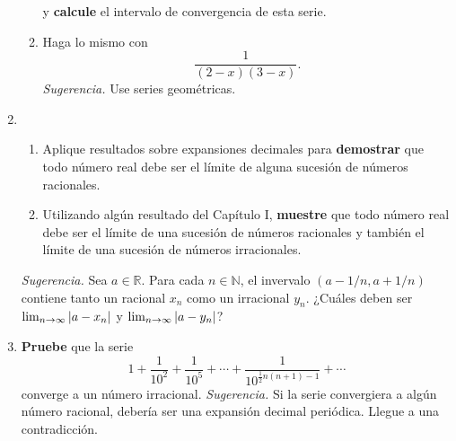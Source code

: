 \documentclass[12pt]{article}
\begin{document}
\begin{enumerate}
\begin{enumerate}
        y \textbf{calcule} el intervalo de convergencia de esta serie.
        \item Haga lo mismo con
        \begin{equation*}
            \frac{1}{(2-x)(3-x)}.
        \end{equation*}
        \textit{Sugerencia.} Use series geométricas.
    \end{enumerate}
    \item \begin{enumerate}
        \item Aplique resultados sobre expansiones decimales para \textbf{demostrar} que todo número real debe ser el límite de alguna sucesión de números racionales.
        \item Utilizando algún resultado del Capítulo I, \textbf{muestre} que todo número real debe ser el límite de una sucesión de números racionales y también el límite de una sucesión de números irracionales.
    \end{enumerate}
    \textit{Sugerencia.} Sea $a\in\mathbb{R}$. Para cada $n\in\mathbb{N}$, el invervalo $(a-1/n,a+1/n)$ contiene tanto un racional $x_n$ como un irracional $y_n$. ¿Cuáles deben ser $\lim_{n\rightarrow\infty}\left| a-x_n \right|$ y $\lim_{n\rightarrow\infty}\left| a-y_n \right|$?
    \item \textbf{Pruebe} que la serie
    \begin{equation*}
        1+\frac{1}{10^2}+\frac{1}{10^5}+\cdots+\frac{1}{10^{\frac{1}{2}n(n+1)-1}}+\cdots
    \end{equation*}
    converge a un número irracional.
    \textit{Sugerencia.} Si la serie convergiera a algún número racional, debería ser una expansión decimal periódica. Llegue a una contradicción.
\end{enumerate}
\end{document}
